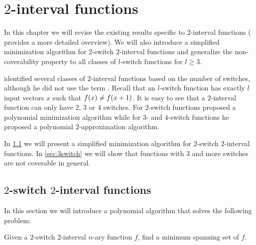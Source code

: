 \chapter{\texorpdfstring{$2$}{2}-interval functions}
\label{chap:2interval}


In this chapter we will revise the existing results specific to
$2$-interval functions
(\citet{Dubovsky2012}
provides a more detailed overview).
We will also introduce a simplified minimization algorithm
for $2$-switch $2$-interval functions
and generalize the non-coverability property to all
classes of $l$-switch functions for $l \geq 3$.

\citeauthor{Dubovsky2012} identified several classes
of $2$-interval functions \citep[p.~5]{Dubovsky2012}
based on the number of switches,
although he did not use the term .
Recall that an $l$-switch function has exactly $l$ input
vectors $x$ such that $f (x) \neq f (x+1)$.
It is easy to see that a $2$-interval function
can only have $2$, $3$ or $4$ switches.
For $2$-switch functions
\citeauthor{Dubovsky2012} proposed
a polynomial minimization algorithm
while for $3$- and $4$-switch functions
he proposed a polynomial $2$-approximation algorithm.


In \cref{sec:2int2switch}
we will present a simplified minimization algorithm
for $2$-switch $2$-interval functions.
In \cref{sec:3switch}
we will show that functions with $3$ and more switches
are not coverable in general.


\section{\texorpdfstring{$2$}{2}-switch
\texorpdfstring{$2$}{2}-interval functions}
\label{sec:2int2switch}

\newcommand{\ftwointtwoswitch}[4]
{#1^{#2}_{\interval{\rep{0}{#2}}{#3},
\interval{#4}{\rep{1}{#2}}}}

\newcommand{\fnba}{\ftwointtwoswitch{f}{n}{b_1}{a_2}}

In this section
we will introduce a polynomial algorithm
that solves the following problem:
\begin{problem}
\label{problem:2switch2intminimization}
Given a $2$-switch
$2$-interval $n$-ary function $f$,
find a minimum spanning set of $f$.
\end{problem}

